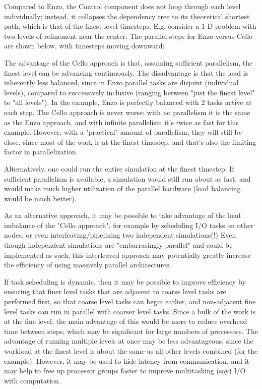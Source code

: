 Compared to Enzo, the Control component does not loop through each
level individually; instead, it collapses the dependency tree to its
theoretical shortest path, which is that of the finest level
timesteps. E.g. consider a 1-D problem with two levels of refinement
near the center. The parallel steps for Enzo versus Cello are shown
below, with timesteps moving downward:


The advantage of the Cello approach is that, assuming sufficient
parallelism, the finest level can be advancing continuously. The
disadvantage is that the load is inherently less balanced, since in
Enzo parallel tasks are disjoint (individual levels), compared to
successively inclusive (ranging between "just the finest level" to
"all levels"). In the example, Enzo is perfectly balanced with 2 tasks
active at each step. The Cello approach is never worse: with no
parallelism it is the same as the Enzo approach, and with infinite
parallelism it's twice as fast for this example. However, with a
"practical" amount of parallelism, they will still be close, since
most of the work is at the finest timestep, and that's also the
limiting factor in parallelization.

Alternatively, one could run the entire simulation at the finest
timestep. If sufficient parallelism is available, a simulation would
still run about as fast, and would make much higher utilization of the
parallel hardware (load balancing would be much better).



As an alternative approach, it may be possible to take advantage of
the load imbalance of the "Cello approach", for example by scheduling
I/O tasks on other nodes, or even interleaving/pipelining two
independent simulations(!) Even though independent simulations are
"embarrasingly parallel" and could be implemented as such, this
interleaved approach may potentially greatly increase the efficiency
of using massively parallel architectures.

  

If task scheduling is dynamic, then it may be possible to improve
efficiency by ensuring that finer level tasks that are adjacent to
coarse level tasks are performed first, so that coarse level tasks can
begin earlier, and non-adjacent fine level tasks can run in parallel
with coarser level tasks. Since a bulk of the work is at the fine
level, the main advantage of this would be more to reduce overhead
time between steps, which may be significant for large numbers of
processors. The advantage of running multiple levels at once may be
less advantageous, since the workload at the finest level is about the
same as all other levels combined (for the example).  However, it may
be used to hide latency from communication, and it may help to free up
processor groups faster to improve multitasking (say) I/O with
computation.

